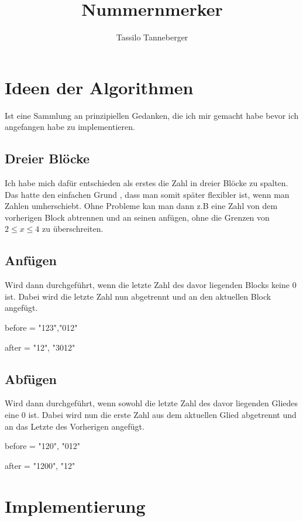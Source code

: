 \documentclass{article}
\begin{document}
\title{Nummernmerker}
\author{Tassilo Tanneberger}

\maketitle

\section{Ideen der Algorithmen}
Ist eine Sammlung an prinzipiellen Gedanken, die ich mir gemacht habe bevor ich angefangen habe zu implementieren.
\subsection{Dreier Blöcke}

Ich habe mich dafür entschieden als erstes die Zahl in dreier Blöcke zu spalten. Das hatte den einfachen Grund , dass man somit später flexibler ist, wenn man Zahlen umherschiebt. Ohne Probleme kan man dann z.B eine Zahl von dem vorherigen Block abtrennen und an seinen anfügen, ohne  die Grenzen von \( 2 \leq x \leq 4  \) zu überschreiten.

\subsection{Anfügen}

Wird dann durchgeführt, wenn die letzte Zahl des davor liegenden Blocks keine 0 ist. Dabei wird die letzte Zahl nun abgetrennt und an den aktuellen Block angefügt. \newline

before = "123","012" 

after = "12", "3012"

\subsection{Abfügen}

Wird dann durchgeführt, wenn sowohl die letzte Zahl des davor liegenden Gliedes eine 0 ist. Dabei wird nun die erste Zahl aus dem aktuellen Glied abgetrennt und an das Letzte des Vorherigen angefügt. \newline

before = "120", "012"

after = "1200", "12"

\section{Implementierung}
\end{document}
